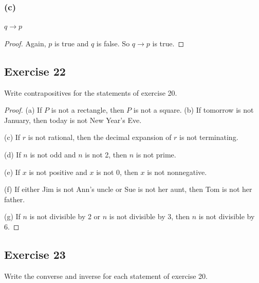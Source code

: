 \documentclass[14pt]{extarticle}
\begin{document}
\subsubsection{(c)} $q \to p$
\begin{proof} Again, $p$ is true and $q$ is false. So $q \to p$ is true.
\end{proof}

\subsection{Exercise 22} Write contrapositives for the statements of exercise
20.

\begin{proof} (a) If $P$ is not a rectangle, then $P$ is not a square.
(b) If tomorrow is not January, then today is not New Year’s Eve.

(c) If $r$ is not rational, then the decimal expansion of $r$ is not
terminating.

(d) If $n$ is not odd and $n$ is not 2, then $n$ is not prime.

(e) If $x$ is not positive and $x$ is not 0, then $x$ is not nonnegative.

(f) If either Jim is not Ann’s uncle or Sue is not her aunt, then Tom is not her
father.

(g) If $n$ is not divisible by 2 or $n$ is not divisible by 3, then $n$ is not
divisible by 6. \end{proof}

\subsection{Exercise 23} Write the converse and inverse for each statement of
exercise 20.
\end{document}
